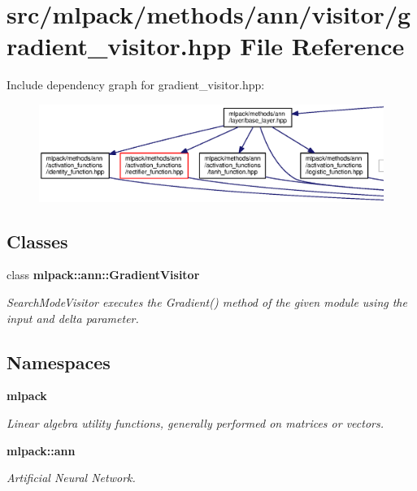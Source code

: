 \section{src/mlpack/methods/ann/visitor/gradient\+\_\+visitor.hpp File Reference}
\label{gradient__visitor_8hpp}
Include dependency graph for gradient\+\_\+visitor.\+hpp\+:
\nopagebreak
\begin{figure}[H]
\begin{center}
\leavevmode
\includegraphics[width=350pt]{gradient__visitor_8hpp__incl}
\end{center}
\end{figure}
\subsection*{Classes}
\begin{DoxyCompactItemize}
\item 
class {\bf mlpack\+::ann\+::\+Gradient\+Visitor}
\begin{DoxyCompactList}\small\item\em Search\+Mode\+Visitor executes the Gradient() method of the given module using the input and delta parameter. \end{DoxyCompactList}\end{DoxyCompactItemize}
\subsection*{Namespaces}
\begin{DoxyCompactItemize}
\item 
 {\bf mlpack}
\begin{DoxyCompactList}\small\item\em Linear algebra utility functions, generally performed on matrices or vectors. \end{DoxyCompactList}\item 
 {\bf mlpack\+::ann}
\begin{DoxyCompactList}\small\item\em Artificial Neural Network. \end{DoxyCompactList}\end{DoxyCompactItemize}


